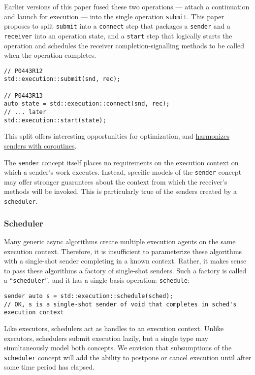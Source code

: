 \documentclass[a4paper,12pt,notitlepage,twoside,openright]{article}
\begin{document}
Earlier versions of this paper fused these two operations --- attach a
continuation and launch for execution --- into the single operation
\texttt{submit}. This paper proposes to split
\texttt{submit} into a \texttt{connect} step
that packages a \texttt{sender} and a
\texttt{receiver} into an operation state, and a
\texttt{start} step that logically starts the operation and
schedules the receiver completion-signalling methods to be called when
the operation completes.

\begin{verbatim}
// P0443R12
std::execution::submit(snd, rec);

// P0443R13
auto state = std::execution::connect(snd, rec);
// ... later
std::execution::start(state);
\end{verbatim}

This split offers interesting opportunities for optimization, and
\protect\hyperlink{appendix-a-note-on-coroutines}{harmonizes senders
with coroutines}.

The \texttt{sender} concept itself places no requirements on
the execution context on which a sender's work executes. Instead,
specific models of the \texttt{sender} concept may offer
stronger guarantees about the context from which the receiver's methods
will be invoked. This is particularly true of the senders created by a
\texttt{scheduler}.

\hypertarget{scheduler}{%
\subsubsection{Scheduler}\label{scheduler}}

Many generic async algorithms create multiple execution agents on the
same execution context. Therefore, it is insufficient to parameterize
these algorithms with a single-shot sender completing in a known
context. Rather, it makes sense to pass these algorithms a factory of
single-shot senders. Such a factory is called a
``\texttt{scheduler}'', and it has a single basis operation:
\texttt{schedule}:

\begin{verbatim}
sender auto s = std::execution::schedule(sched);
// OK, s is a single-shot sender of void that completes in sched's execution context
\end{verbatim}

Like executors, schedulers act as handles to an execution context.
Unlike executors, schedulers submit execution lazily, but a single type
may simultaneously model both concepts. We envision that subsumptions of
the \texttt{scheduler} concept will add the ability to
postpone or cancel execution until after some time period has elapsed.
\end{document}
